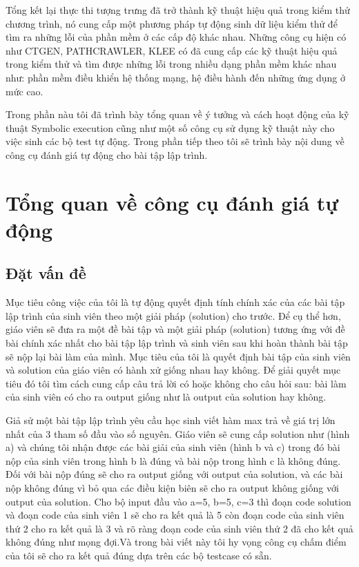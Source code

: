\documentclass[12pt,a4paper]{article}
\begin{document}
Tổng kết lại thực thi tượng trưng đã trở thành kỹ thuật hiệu quả trong kiểm thử chương trình, nó cung cấp một phương pháp tự động sinh dữ liệu kiểm thử để tìm ra những lỗi của phần mềm ở các cấp độ khác nhau. Những công cụ hiện có như CTGEN, PATHCRAWLER, KLEE có đã cung cấp các kỹ thuật hiệu quả trong kiểm thử và tìm được những lỗi trong nhiều dạng phần mềm khác nhau như: phần mềm điều khiển hệ thống mạng, hệ điều hành đến những ứng dụng ở mức cao.

Trong phần nàu tôi đã trình bày tổng quan về ý tưởng và cách hoạt động của kỹ thuật Symbolic execution cũng như một số công cụ sử dụng kỹ thuật này cho việc sinh các bộ test tự động. Trong phần tiếp theo tôi sẽ trình bày nội dung về công cụ đánh giá tự động cho bài tập lập trình.\newpage

\section{Tổng quan về công cụ đánh giá tự động}

\subsection{Đặt vấn đề}

Mục tiêu công việc của tôi là tự động quyết định tính chính xác của các bài tập lập trình của sinh viên theo một giải pháp (solution) cho trước. Để cụ thể hơn, giáo viên sẽ đưa ra một đề bài tập và một giải pháp (solution) tương ứng với đề bài chính xác nhất cho bài tập lập trình và sinh viên sau khi hoàn thành bài tập sẽ nộp lại bài làm của mình. Mục tiêu của tôi là quyết định bài tập của sinh viên và solution của giáo viên có hành xử giống nhau hay không. Để giải quyết mục tiêu đó tôi tìm cách cung cấp câu trả lời có hoặc không cho câu hỏi sau: bài làm của sinh viên có cho ra output giống như là output của solution hay không.

Giả sử một bài tập lập trình yêu cầu học sinh viết hàm max trả về giá trị lớn nhất của 3 tham số đầu vào số nguyên. Giáo viên sẽ cung cấp solution như (hình a) và chúng tôi nhận được các bài giải của sinh viên (hình b và c) trong đó bài nộp của sinh viên trong hình b là đúng và bài nộp trong hình c là không đúng. Đối với bài nộp đúng sẽ cho ra output giống với output của solution, và các bài nộp không đúng vì bỏ qua các điều kiện biên sẽ cho ra output không giống với output của solution. Cho bộ input đầu vào 
a=5, b=5, c=3 thì đoạn code solution và đoạn code của sinh viên 1 sẽ cho ra kết quả là 5 còn đoạn code của sinh viên thứ 2 cho ra kết quả là 3 và rõ ràng đoạn code của sinh viên thứ 2 đã cho kết quả không đúng như mọng đợi.Và trong bài viết này tôi hy vọng công cụ chấm điểm của tôi sẽ cho ra kết quả đúng dựa trên các bộ testcase có sẵn.
\end{document}
